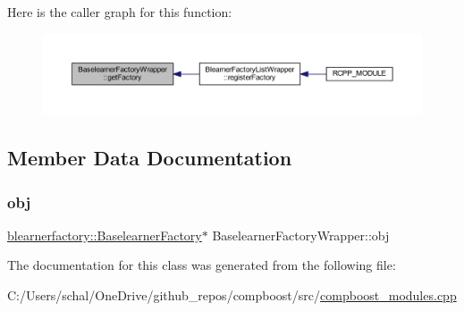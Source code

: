 Here is the caller graph for this function\+:\nopagebreak
\begin{figure}[H]
\begin{center}
\leavevmode
\includegraphics[width=350pt]{class_baselearner_factory_wrapper_ac32811bfb4833aab5d11c7c303070485_icgraph}
\end{center}
\end{figure}


\subsection{Member Data Documentation}
\mbox{\label{class_baselearner_factory_wrapper_a6dc7067dc7a33b29e81bb527b1acfb23}} 
\subsubsection{\texorpdfstring{obj}{obj}}
{\footnotesize\ttfamily \mbox{\hyperlink{classblearnerfactory_1_1_baselearner_factory}{blearnerfactory\+::\+Baselearner\+Factory}}$\ast$ Baselearner\+Factory\+Wrapper\+::obj\hspace{0.3cm}{\ttfamily [protected]}}



The documentation for this class was generated from the following file\+:\begin{DoxyCompactItemize}
\item 
C\+:/\+Users/schal/\+One\+Drive/github\+\_\+repos/compboost/src/\mbox{\hyperlink{compboost__modules_8cpp}{compboost\+\_\+modules.\+cpp}}\end{DoxyCompactItemize}
